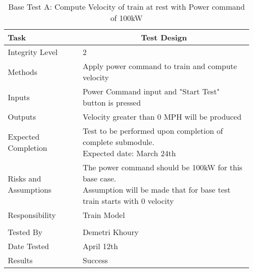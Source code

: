 \documentclass[]{article}
\begin{document}
    \begin{table}[H]
        \centering
        \caption{Base Test A: Compute Velocity of train at rest with Power command of 100kW}
        \begin{tabular}{|l|l|}
            \hline
            Task & \multicolumn{1}{c|}{Test Design} \\ \hline
            Integrity Level & 2 \\ \hline
            Methods & Apply power command to train and compute velocity  \\ \hline
            Inputs &  Power Command input and "Start Test" button is pressed \\ \hline
            Outputs &  Velocity greater than 0 MPH will be produced  \\ \hline
            Expected Completion & \parbox[t]{10cm}{Test to be performed upon completion of complete submodule.\\ Expected date: March 24th}\\ \hline
            Risks and Assumptions & \parbox[t]{10cm}{The power command should be 100kW for this base case. \\ Assumption will be made that for base test train starts with 0 velocity} \\ \hline
            Responsibility & Train Model\\ \hline
            \\ \hline
            Tested By   &  Demetri Khoury\\	\hline
            Date Tested & \parbox[t]{10cm}{April 12th}\\ \hline
            Results & Success\\ \hline
        \end{tabular}
    \end{table}
\end{document}
